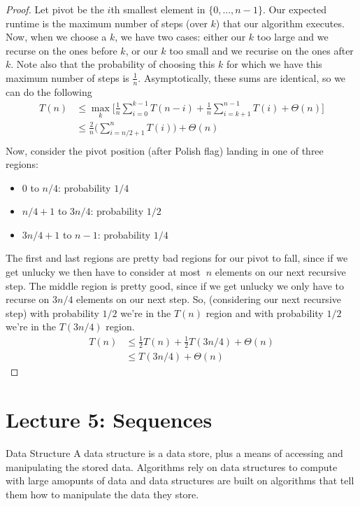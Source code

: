 \documentclass[11pt]{article}
\begin{document}
\begin{proof}
    Let pivot be the $i$th smallest element in $\{0,...,n-1\}$. Our expected runtime is the maximum
    number of steps (over $k$) that our algorithm executes. Now, when we choose a $k$, we have two
    cases: either our $k$ too large and we recurse on the ones before $k$, or our $k$ too small and
    we recurise on the ones after $k$. Note also that the probability of choosing this $k$ for which
    we have this maximum number of steps is $\frac{1}{n}$. Asymptotically, these sums are identical,
    so we can do the following
    \begin{align*}
        T(n) &\leq \max_k \Bigg[ \frac{1}{n}\sum_{i=0}^{k-1} T(n-i) 
            + \frac{1}{n}\sum_{i=k+1}^{n-1} T(i) + \Theta(n) \Bigg] \\
             &\leq \frac{2}{n}\Bigg( \sum_{i=n/2+1}^{n} T(i) \Bigg) + \Theta(n) \\
    \end{align*}
    Now, consider the pivot position (after Polish flag) landing in one of three regions:
    \begin{itemize}
        \item 0 to $n/4$: probability $1/4$
        \item $n/4+1$ to $3n/4$: probability $1/2$
        \item $3n/4+1$ to $n-1$: probability $1/4$
    \end{itemize}
    The first and last regions are pretty bad regions for our pivot to fall, since if we get unlucky
    we then have to consider at most $~n$ elements on our next recursive step. The middle region is
    pretty good, since if we get unlucky we only have to recurse on $3n/4$ elements on our next step.
    So, (considering our next recursive step) with probability $1/2$ we're in the $T(n)$ region and
    with probability $1/2$ we're in the $T(3n/4)$ region.
    \begin{align*}
        T(n) &\leq \frac{1}{2}T(n) + \frac{1}{2}T(3n/4) + \Theta(n) \\
             &\leq T(3n/4) + \Theta(n)
    \end{align*}


\end{proof}

\section{Lecture 5: Sequences}

\begin{definitionbox}{Data Structure}
    A data structure is a data store, plus a means of accessing and manipulating the stored data.
    Algorithms rely on data structures to compute with large amopunts of data and data structures
    are built on algorithms that tell them how to manipulate the data they store.
\end{definitionbox}
\end{document}

